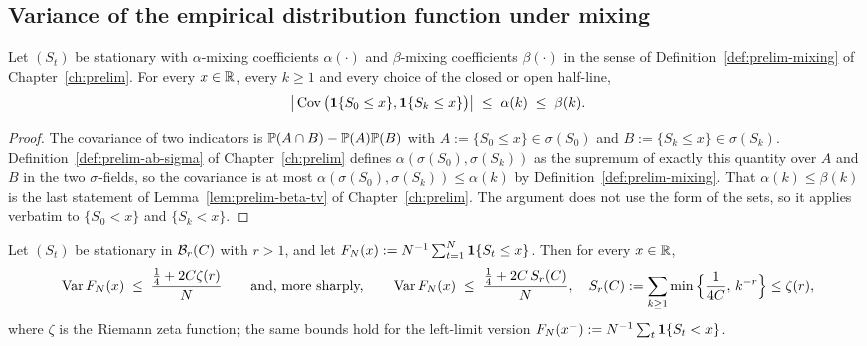\documentclass[../../../main.tex]{subfiles}
\begin{document}
\subsection{Variance of the empirical distribution function under mixing}

\begin{lemma}\label{lem:sharp-cov}
Let $(S_t)$ be stationary with $\alpha$-mixing coefficients $\alpha(\cdot)$ and $\beta$-mixing coefficients $\beta(\cdot)$ in the sense of Definition~\ref{def:prelim-mixing} of Chapter~\ref{ch:prelim}. For every $x\in\mathbb{R}$, every $k\ge1$ and every choice of the closed or open half-line,
\[
\big|\operatorname{Cov}\big(\mathbf{1}\{S_0\le x\},\mathbf{1}\{S_k\le x\}\big)\big|\;\le\;\alpha(k)\;\le\;\beta(k).
\]
\end{lemma}

\begin{proof}
The covariance of two indicators is $\mathbb{P}(A\cap B)-\mathbb{P}(A)\mathbb{P}(B)$ with $A:=\{S_0\le x\}\in\sigma(S_0)$ and $B:=\{S_k\le x\}\in\sigma(S_k)$. Definition~\ref{def:prelim-ab-sigma} of Chapter~\ref{ch:prelim} defines $\alpha(\sigma(S_0),\sigma(S_k))$ as the supremum of exactly this quantity over $A$ and $B$ in the two $\sigma$-fields, so the covariance is at most $\alpha(\sigma(S_0),\sigma(S_k))\le\alpha(k)$ by Definition~\ref{def:prelim-mixing}. That $\alpha(k)\le\beta(k)$ is the last statement of Lemma~\ref{lem:prelim-beta-tv} of Chapter~\ref{ch:prelim}. The argument does not use the form of the sets, so it applies verbatim to $\{S_0<x\}$ and $\{S_k<x\}$.
\end{proof}

\begin{lemma}\label{lem:sharp-var}
Let $(S_t)$ be stationary in $\mathcal B_{r}(C)$ with $r>1$, and let $F_N(x):=N^{-1}\sum_{t=1}^N\mathbf{1}\{S_t\le x\}$. Then for every $x\in\mathbb{R}$,
\[
\operatorname{Var} F_N(x)\;\le\;\frac{\tfrac14+2C\zeta(r)}N
\qquad\text{and, more sharply,}\qquad
\operatorname{Var} F_N(x)\;\le\;\frac{\tfrac14+2C\,S_r(C)}N,\quad
S_r(C):=\sum_{k\ge1}\min\Big\{\frac1{4C},\,k^{-r}\Big\}\le\zeta(r),
\]
where $\zeta$ is the Riemann zeta function; the same bounds hold for the left-limit version $F_N(x^-):=N^{-1}\sum_t\mathbf{1}\{S_t<x\}$.
\end{lemma}
\end{document}
